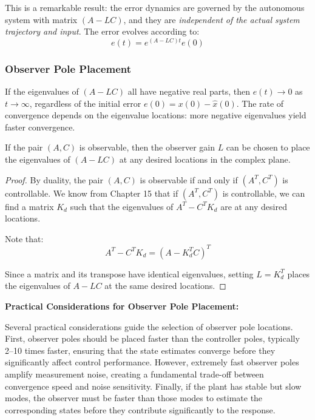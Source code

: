 This is a remarkable result: the error dynamics are governed by the autonomous system with matrix $(A - LC)$, and they are \textit{independent of the actual system trajectory and input}. The error evolves according to:
\begin{equation}
e(t) = e^{(A-LC)t} e(0)
\end{equation}

\subsubsection{Observer Pole Placement}

If the eigenvalues of $(A - LC)$ all have negative real parts, then $e(t) \to 0$ as $t \to \infty$, regardless of the initial error $e(0) = x(0) - \hat{x}(0)$. The rate of convergence depends on the eigenvalue locations: more negative eigenvalues yield faster convergence.

\begin{theorem}
If the pair $(A, C)$ is observable, then the observer gain $L$ can be chosen to place the eigenvalues of $(A - LC)$ at any desired locations in the complex plane.
\end{theorem}

\begin{proof}
By duality, the pair $(A, C)$ is observable if and only if $(A^T, C^T)$ is controllable. We know from Chapter 15 that if $(A^T, C^T)$ is controllable, we can find a matrix $K_d$ such that the eigenvalues of $A^T - C^T K_d$ are at any desired locations.

Note that:
\begin{equation}
A^T - C^T K_d = (A - K_d^T C)^T
\end{equation}

Since a matrix and its transpose have identical eigenvalues, setting $L = K_d^T$ places the eigenvalues of $A - LC$ at the same desired locations.
\end{proof}

\textbf{Practical Considerations for Observer Pole Placement:}

Several practical considerations guide the selection of observer pole locations. First, observer poles should be placed faster than the controller poles, typically 2--10 times faster, ensuring that the state estimates converge before they significantly affect control performance. However, extremely fast observer poles amplify measurement noise, creating a fundamental trade-off between convergence speed and noise sensitivity. Finally, if the plant has stable but slow modes, the observer must be faster than those modes to estimate the corresponding states before they contribute significantly to the response.

